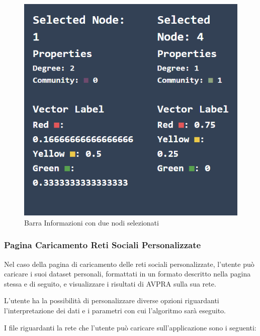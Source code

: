 \documentclass[a4paper,12pt]{report}
\begin{document}
\begin{center}
				\begin{figure}[H]
				\centering
				\includegraphics[width=0.6\linewidth]{infobar2}
				\caption{Barra Informazioni con due nodi selezionati}
				\end{figure}
			\end{center}
			
			\subsubsection{Pagina Caricamento Reti Sociali Personalizzate}
			Nel caso della pagina di caricamento delle reti sociali personalizzate, l'utente può caricare i suoi dataset personali, formattati in un formato descritto nella pagina stessa e di seguito, e visualizzare i risultati di AVPRA sulla sua rete. 

			L'utente ha la possibilità di personalizzare diverse opzioni riguardanti l'interpretazione dei dati e i parametri con cui l'algoritmo sarà eseguito. 

			I file riguardanti la rete che l'utente può caricare sull'applicazione sono i seguenti:
\end{document}
